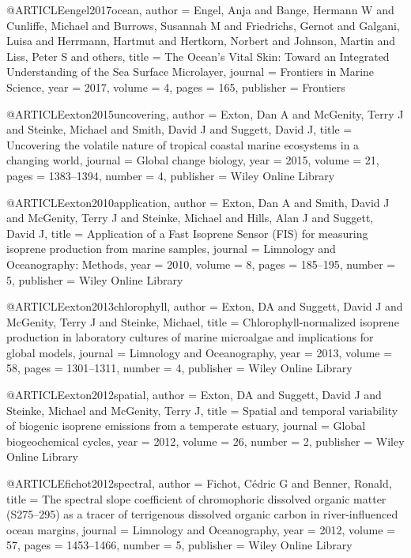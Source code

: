 @ARTICLE{engel2017ocean,
  author = {Engel, Anja and Bange, Hermann W and Cunliffe, Michael and Burrows,
	Susannah M and Friedrichs, Gernot and Galgani, Luisa and Herrmann,
	Hartmut and Hertkorn, Norbert and Johnson, Martin and Liss, Peter
	S and others},
  title = {The Ocean's Vital Skin: Toward an Integrated Understanding of the
	Sea Surface Microlayer},
  journal = {Frontiers in Marine Science},
  year = {2017},
  volume = {4},
  pages = {165},
  publisher = {Frontiers}
}

@ARTICLE{exton2015uncovering,
  author = {Exton, Dan A and McGenity, Terry J and Steinke, Michael and Smith,
	David J and Suggett, David J},
  title = {Uncovering the volatile nature of tropical coastal marine ecosystems
	in a changing world},
  journal = {Global change biology},
  year = {2015},
  volume = {21},
  pages = {1383--1394},
  number = {4},
  publisher = {Wiley Online Library}
}

@ARTICLE{exton2010application,
  author = {Exton, Dan A and Smith, David J and McGenity, Terry J and Steinke,
	Michael and Hills, Alan J and Suggett, David J},
  title = {Application of a Fast Isoprene Sensor (FIS) for measuring isoprene
	production from marine samples},
  journal = {Limnology and Oceanography: Methods},
  year = {2010},
  volume = {8},
  pages = {185--195},
  number = {5},
  publisher = {Wiley Online Library}
}

@ARTICLE{exton2013chlorophyll,
  author = {Exton, DA and Suggett, David J and McGenity, Terry J and Steinke,
	Michael},
  title = {Chlorophyll-normalized isoprene production in laboratory cultures
	of marine microalgae and implications for global models},
  journal = {Limnology and Oceanography},
  year = {2013},
  volume = {58},
  pages = {1301--1311},
  number = {4},
  publisher = {Wiley Online Library}
}

@ARTICLE{exton2012spatial,
  author = {Exton, DA and Suggett, David J and Steinke, Michael and McGenity,
	Terry J},
  title = {Spatial and temporal variability of biogenic isoprene emissions from
	a temperate estuary},
  journal = {Global biogeochemical cycles},
  year = {2012},
  volume = {26},
  number = {2},
  publisher = {Wiley Online Library}
}

@ARTICLE{fichot2012spectral,
  author = {Fichot, C{\'e}dric G and Benner, Ronald},
  title = {The spectral slope coefficient of chromophoric dissolved organic
	matter (S275--295) as a tracer of terrigenous dissolved organic carbon
	in river-influenced ocean margins},
  journal = {Limnology and Oceanography},
  year = {2012},
  volume = {57},
  pages = {1453--1466},
  number = {5},
  publisher = {Wiley Online Library}
}

